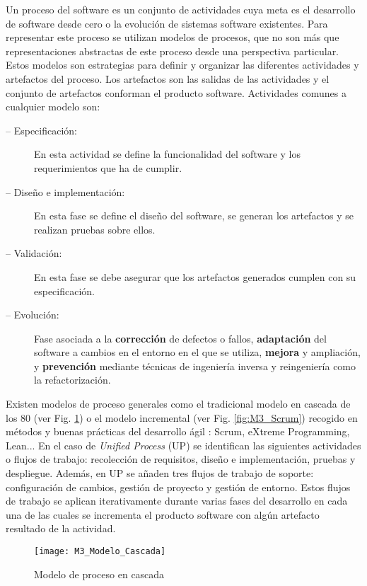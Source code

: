 Un proceso del software es un conjunto de actividades cuya meta es el desarrollo de software desde cero o la evolución de sistemas software existentes. Para representar este proceso se utilizan modelos de procesos, que no son más que representaciones abstractas de este proceso desde una perspectiva particular. Estos modelos son estrategias para definir y organizar las diferentes actividades y artefactos del proceso. Los artefactos son las salidas de las actividades y el conjunto de artefactos conforman el producto software. Actividades comunes a cualquier modelo son:
\begin{description}
	\item[-- Especificación:] En esta actividad se define la funcionalidad del software y los requerimientos que ha de cumplir.
	\item[-- Diseño e implementación:] En esta fase se define el diseño del software, se generan los artefactos y se realizan pruebas sobre ellos.
	\item[-- Validación:] En esta fase se debe asegurar que los artefactos generados cumplen con su especificación.
	\item[-- Evolución:] Fase asociada a la \textbf{corrección} de defectos o fallos, \textbf{adaptación} del software a cambios en el entorno en el que se utiliza, \textbf{mejora} y ampliación, y \textbf{prevención} mediante técnicas de ingeniería inversa y reingeniería como la refactorización.
\end{description}

Existen modelos de proceso generales como el tradicional modelo en cascada de los 80 (ver Fig. \ref{fig:M3_Modelo_Cascada}) o el modelo incremental (ver Fig. \ref{fig:M3_Scrum}) recogido en métodos y buenas prácticas del desarrollo ágil \cite{scrum_master_scrum_2019}: Scrum, eXtreme Programming, Lean... En el caso de  \textit{Unified Process} (UP) \cite{jacobson_proceso_2000} se identifican las siguientes actividades o flujos de trabajo: recolección de requisitos, diseño e implementación, pruebas y despliegue. Además, en UP se añaden tres flujos de trabajo de soporte: configuración de cambios, gestión de proyecto y gestión de entorno. Estos flujos de trabajo se aplican iterativamente durante varias fases del desarrollo en cada una de las cuales se incrementa el producto software con algún artefacto resultado de la actividad.

\begin{figure}[!h]
	\centering
	\texttt{[image: M3\_Modelo\_Cascada]}
	\caption{Modelo de proceso en cascada \cite{wikipedia_software_2019}}
	\label{fig:M3_Modelo_Cascada}
\end{figure}
\FloatBarrier

